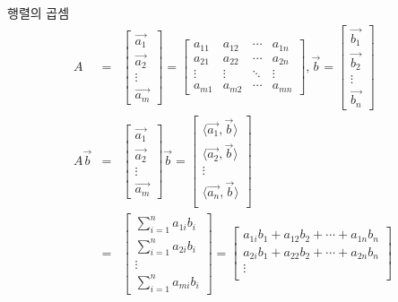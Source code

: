 \documentclass[10pt,t]{beamer}
\begin{document}
\begin{frame}{행렬의 곱셈}
 \pagebreak
\begin{eqnarray*}
    A &=& \begin{bmatrix}
        \vec{a_1}\\
        \vec{a_2}\\
        \vdots \\
        \vec{a_m}
    \end{bmatrix} = \begin{bmatrix}
        a_{11} & a_{12} & \cdots & a_{1n} \\
        a_{21} & a_{22} & \cdots & a_{2n} \\
         \vdots & \vdots & \ddots & \vdots \\
        a_{m1} & a_{m2} & \cdots & a_{mn} 
    \end{bmatrix}, \vec{b} = \begin{bmatrix}
        \vec{b_1}\\
        \vec{b_2}\\
        \vdots \\
        \vec{b_n}
    \end{bmatrix}\\
    A\vec{b} &=& \begin{bmatrix}
        \vec{a_1}\\
        \vec{a_2}\\
        \vdots \\
        \vec{a_m}
    \end{bmatrix} \vec{b} = \begin{bmatrix}
        \langle \vec{a_1}, \vec{b} \rangle\\
        \langle \vec{a_2}, \vec{b} \rangle\\
        \vdots\\
        \langle \vec{a_n}, \vec{b} \rangle\\
    \end{bmatrix} \\
    &=& \begin{bmatrix}
        \sum _{i=1}^n a_{1i}b_i \\
        \sum _{i=1}^n a_{2i}b_i \\
        \vdots\\
        \sum _{i=1}^n a_{mi}b_i 
    \end{bmatrix} =\begin{bmatrix}
        a_{1i}b_1 + a_{12}b_2 + \cdots + a_{1n}b_n \\
        a_{2i}b_1 + a_{22}b_2 + \cdots + a_{2n}b_n \\
        \vdots\\

\end{bmatrix}
\end{eqnarray*}
\end{frame}
\end{document}
